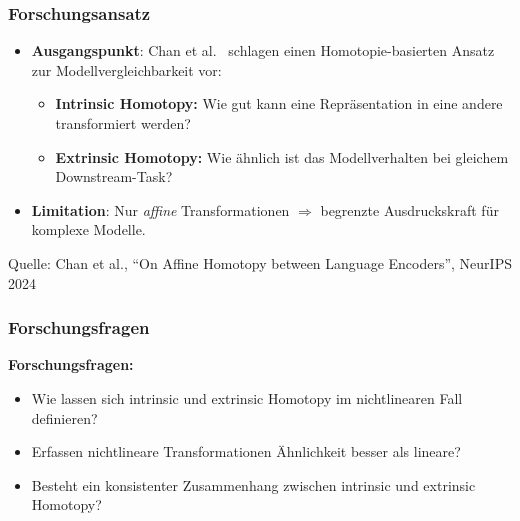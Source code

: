 \begingroup
\frametitle{Forschungsansatz}
\begin{frame}
\begin{itemize}
    \item \textbf{Ausgangspunkt}: Chan et al.~\cite{chan_affine_2024} schlagen einen Homotopie-basierten Ansatz zur Modellvergleichbarkeit vor:
    \begin{itemize}
      \item \textbf{Intrinsic Homotopy:} Wie gut kann eine Repräsentation in eine andere transformiert werden?
      \item \textbf{Extrinsic Homotopy:} Wie ähnlich ist das Modellverhalten bei gleichem Downstream-Task?
    \end{itemize}
    
    \vspace{0.8em}
    \item \textbf{Limitation}: Nur \emph{affine} Transformationen $\Rightarrow$ begrenzte Ausdruckskraft für komplexe Modelle.
    \end{itemize}
\vfill
{\tiny Quelle: Chan et al., “On Affine Homotopy between Language Encoders”, NeurIPS 2024~\cite{chan_affine_2024}}
\end{frame}
\endgroup

\begingroup
\frametitle{Forschungsfragen}
\begin{frame}
\vspace{0.8em}
\textbf{Forschungsfragen:}
\begin{itemize}
  \item Wie lassen sich intrinsic und extrinsic Homotopy im nichtlinearen Fall definieren?
  \item Erfassen nichtlineare Transformationen Ähnlichkeit besser als lineare?
  \item Besteht ein konsistenter Zusammenhang zwischen intrinsic und extrinsic Homotopy?
\end{itemize}
\end{frame}
\endgroup

